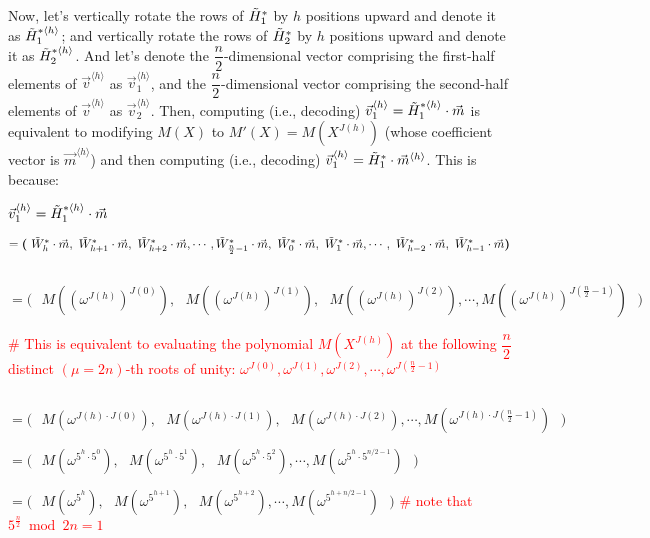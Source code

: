 Now, let's vertically rotate the rows of $\tilde{H}_1^*$ by $h$ positions upward and denote it as $\tilde{H}_1^{*\langle h \rangle}$; and vertically rotate the rows of $\tilde{H}_2^*$ by $h$ positions upward and denote it as $\tilde{H}_2^{*\langle h \rangle}$. And let's denote the $\dfrac{n}{2}$-dimensional vector comprising the first-half elements of $\vec{v}^{\langle h \rangle}$ as $\vec{v}_1^{\langle h \rangle}$, and the $\dfrac{n}{2}$-dimensional vector comprising the second-half elements of $\vec{v}^{\langle h \rangle}$ as $\vec{v}_2^{\langle h \rangle}$. 
Then, computing (i.e., decoding) $\vec{v}_1^{\langle h \rangle} = \tilde{H}_1^{*\langle h \rangle}\cdot \vec{m}$ is equivalent to modifying $M(X)$ to $M'(X) = M(X^{J(h)})$ (whose coefficient vector is $\vec{m}^{\langle h \rangle}$) and then computing (i.e., decoding) $\vec{v}_1^{\langle h \rangle} = \tilde{H}_1^{*}\cdot \vec{m}^{\langle h \rangle}$. This is because:

$\vec{v}_1^{\langle h \rangle} =\tilde{H}_1^{*\langle h \rangle}\cdot \vec{m}$

$ = \bm{(} \text{ } \tilde{W}^*_{h}\cdot\vec{m}, \text{ } \tilde{W}^*_{h+1}\cdot\vec{m}, \text{ } \tilde{W}^*_{h+2}\cdot\vec{m}, \cdots, \tilde{W}^*_{\frac{n}{2}-1}\cdot\vec{m}, \text{ } \tilde{W}^*_{0}\cdot\vec{m}, \text{ }\tilde{W}^*_{1}\cdot\vec{m}, \cdots, \text{ } \tilde{W}^*_{h-2}\cdot\vec{m}, \text{ } \tilde{W}^*_{h-1}\cdot\vec{m}  \bm{)}$

$ $

$= \bm{(} \text{ } M((\omega^{J(h)})^{J(0)}), \text{ } M((\omega^{J(h)})^{J(1)}), \text{ } M((\omega^{J(h)})^{J(2)}), \cdots, M((\omega^{J(h)})^{J(\frac{n}{2}-1)}) \text{ } \bm{)}$


\textcolor{red}{\# This is equivalent to evaluating the polynomial $M(X^{J(h)})$ at the following $\dfrac{n}{2}$ distinct $(\mu=2n)$-th roots of unity: $\omega^{J(0)}, \omega^{J(1)},  \omega^{J(2)}, \cdots, \omega^{J(\frac{n}{2} - 1)}$}

$ $

$= \bm{(} \text{ } M(\omega^{J(h)\cdot J(0)}), \text{ } M(\omega^{J(h)\cdot J(1)}), \text{ } M(\omega^{J(h)\cdot J(2)}), \cdots, M(\omega^{J(h)\cdot J(\frac{n}{2}-1)}) \text{ } \bm{)}$

$= \bm{(} \text{ } M(\omega^{5^h\cdot 5^0}), \text{ } M(\omega^{5^h\cdot 5^1}), \text{ } M(\omega^{5^h\cdot 5^2}), \cdots, M(\omega^{5^h\cdot 5^{n/2-1}}) \text{ } \bm{)}$

$= \bm{(} \text{ } M(\omega^{5^{h}}), \text{ } M(\omega^{5^{h+1}}), \text{ } M(\omega^{5^{h+2}}), \cdots, M(\omega^{5^{h+n/2-1}}) \text{ } \bm{)}$ \textcolor{red}{ \# note that $5^{\frac{n}{2}} \bmod 2n = 1$}

